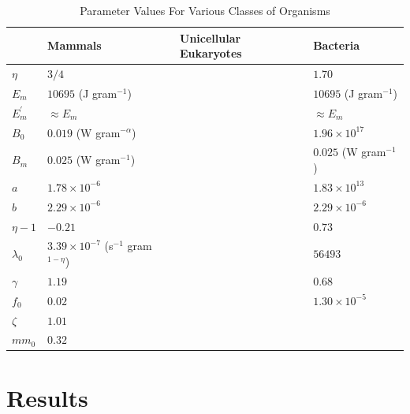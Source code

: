 \documentclass[12pt,english]{article}
\begin{document}
\begin{spacing}{1.9}
\begin{table}[h]
\caption{Parameter Values For Various Classes of Organisms}
\label{parameter-values}
    \begin{center}
    \small
     \begin{tabular}{| p{1.2cm}| p{3.2cm} | p{2.6cm} | p{3.2cm} | }
     \hline
     & {\bf Mammals} & {\bf Unicellular Eukaryotes} & {\bf Bacteria} \\
     \hline
   $\eta$ & $3/4$ & & $1.70$ \\ 
   $E_{m}$ & $10695$ (J gram$^{-1}$) & & $10695$ (J gram$^{-1}$) \\ 
   $E_{m}^{\prime}$ & $\approx E_{m}$ & & $\approx E_{m}$ \\ 
   $B_{0}$ & $0.019$ (W gram$^{-\alpha}$) & & $1.96\times10^{17}$ \\
   $B_{m}$ & $0.025$ (W gram$^{-1}$)   & & $0.025$ (W gram$^{-1}$)\\
   $a$ & $1.78\times10^{-6}$ & & $1.83\times10^{13}$ \\ 
   $b$ & $2.29\times10^{-6}$ & & $2.29\times10^{-6}$ \\  
   $\eta-1$ & $-0.21$ & & $0.73$ \\ 
   $\lambda_{0}$ & $3.39\times10^{-7}$ (s$^{-1}$ gram$^{1-\eta}$) & & $56493$ \\ 
   $\gamma$ & $1.19$ & & $0.68$ \\ 
   $f_{0}$ & $0.02$ & & $1.30\times10^{-5}$ \\ 
   $\zeta$ & $1.01$ & & \\ 
   $mm_{0}$ & $0.32$ & & \\ 
   
      
   \hline
    \end{tabular}
    \end{center}
   \end{table}






\section{Results}



\end{spacing}
\end{document}
